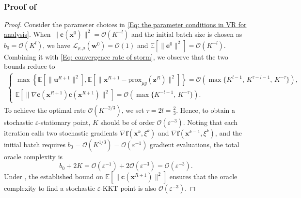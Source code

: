 \documentclass{article}
\theoremstyle{plain}
\theoremstyle{definition}
\theoremstyle{remark}
\newcommand{\EE}{\mathbb{E}}
\newcommand{\prox}{\mathrm{prox}}
\newcommand{\bx}{\bm{x}}
\newcommand{\bc}{\bm{c}}
\newcommand{\be}{\bm{e}}
\newcommand{\bu}{\bm{u}}
\newcommand{\bz}{\bm{z}}
\newcommand{\calL}{\mathcal{L}}
\newcommand{\calO}{\mathcal{O}}
\newcommand{\bw}{\bm{w}}
\newcommand{\tf}{\mathbf{f}}
\numberwithin{equation}{section}
\begin{document}
\subsubsection{Proof of }
\label{proof: storm with feasibility}
\begin{proof}
Consider the parameter choices in \eqref{Eq: the parameter conditions in VR for analysis}.
When $\|\bc(\bx^{0})\|^{2} = \calO(K^{-l})$ and the initial batch size is chosen as $b_0 = \calO(K^{l})$, we have $\calL_{\rho,\mu}(\bw^{0}) = \calO(1)$ and $\EE[\| \be^0\|^2] = \calO(K^{-l})$. Combining it with \eqref{Eq: convergence rate of storm}, we observe that the two bounds reduce to
\begin{align}
    \begin{cases}
    \max\left\{ \EE[\|\bu^{R+1}\|^{2}], \EE[\|\bx^{R+1}- \prox_{\mu g}(\bz^{R})\|^{2}] \right\} = \calO\!\left(\max\{K^{l-1},\,K^{\tau-l-1},\,K^{-\tau}\}\right), \\
    \EE[\|\nabla \bc(\bx^{R+1}) \bc(\bx^{R+1})\|^{2}] = \calO\!\left(\max\{K^{-l-1},\,K^{-\tau}\}\right).
    \end{cases} \label{Eq: the reduced complexity order of storm for analysis}
\end{align}
To achieve the optimal rate $\calO(K^{-2/3})$, we set $\tau = 2l = \tfrac{2}{3}$. Hence, to obtain a stochastic $\varepsilon$-stationary point, $K$ should be of order $\calO(\varepsilon^{-3})$. Noting that each iteration calls two stochastic gradients $\nabla \tf(\bx^{k},\xi^{k})$ and $\nabla \tf(\bx^{k-1},\xi^{k})$, and the initial batch requires $b_0 = \calO(K^{1/3}) = \calO(\varepsilon^{-1})$ gradient evaluations, the total oracle complexity is
\[
b_0 + 2K = \calO(\varepsilon^{-1}) + 2\calO(\varepsilon^{-3}) = \calO(\varepsilon^{-3}).
\]
Under , the established bound on $\EE[\|\bc(\bx^{R+1})\|^{2}]$ ensures that the oracle complexity to find a stochastic $\varepsilon$-KKT point is also $\calO(\varepsilon^{-3})$.
\end{proof}
\end{document}
